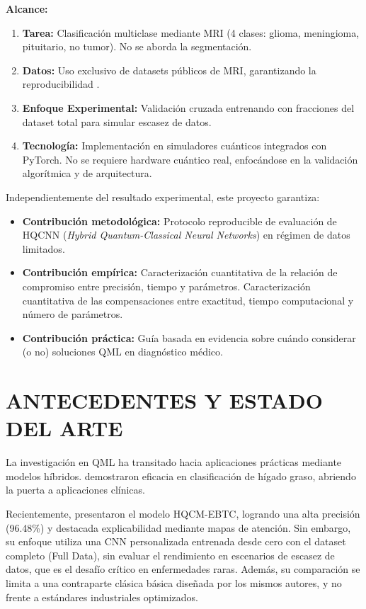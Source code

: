 \documentclass[12pt,letterpaper]{article}
\begin{document}
    \textbf{Alcance:}
    \begin{enumerate}
        \item \textbf{Tarea:} Clasificación multiclase mediante MRI (4 clases: glioma, meningioma, pituitario, no tumor).
        No se aborda la segmentación.
        \item \textbf{Datos:} Uso exclusivo de datasets públicos de MRI, garantizando la reproducibilidad \citep{nickparvar2023dataset}.
        \item \textbf{Enfoque Experimental:} Validación cruzada entrenando con fracciones del dataset total para simular escasez de datos.
        \item \textbf{Tecnología:} Implementación en simuladores cuánticos integrados con PyTorch. No se requiere hardware cuántico real, enfocándose en la validación algorítmica y de arquitectura.
    \end{enumerate}

    Independientemente del resultado experimental, este proyecto garantiza: 
    \begin{itemize}
        \item \textbf{Contribución metodológica:} Protocolo reproducible de evaluación de HQCNN (\textit{Hybrid Quantum-Classical Neural Networks}) en régimen de datos limitados.
        \item \textbf{Contribución empírica:} Caracterización cuantitativa de la relación de compromiso entre precisión, tiempo y parámetros. Caracterización cuantitativa de las compensaciones entre exactitud, tiempo computacional y número de parámetros.
        \item \textbf{Contribución práctica:} Guía basada en evidencia sobre cuándo 
    considerar (o no) soluciones QML en diagnóstico médico.
    \end{itemize}

    \newpage
    \section{ANTECEDENTES Y ESTADO DEL ARTE}
    \vspace{-0.5cm}

    La investigación en QML ha transitado hacia aplicaciones prácticas mediante modelos híbridos. \citet{lusnig2024leveraging} demostraron eficacia en clasificación de hígado graso, abriendo la puerta a aplicaciones clínicas.

    Recientemente, \citet{haddou2025hqcm} presentaron el modelo HQCM-EBTC, logrando una alta precisión (96.48\%) y destacada explicabilidad mediante mapas de atención. Sin embargo, su enfoque utiliza una CNN personalizada entrenada desde cero con el dataset completo (Full Data), sin evaluar el rendimiento en escenarios de escasez de datos, que es el desafío crítico en enfermedades raras. Además, su comparación se limita a una contraparte clásica básica diseñada por los mismos autores, y no frente a estándares industriales optimizados.
\end{document}
